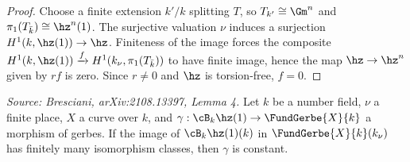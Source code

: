 \begin{proof}
  Choose a finite extension \(k'/k\) splitting \(T\), so \(T_{k'} \cong \Gm^n\) and
  \(\pi_1(T_{\bar{k}}) \cong \hz^n(1)\). The surjective valuation \(\nu\) induces a
  surjection \(H^1(k, \hz(1)) \to \hz\). Finiteness of the image forces the composite
  \(H^1(k, \hz(1)) \xrightarrow{f} H^1(k_\nu, \pi_1(T_{\bar{k}}))\) to have finite
  image, hence the map \(\hz \to \hz^n\) given by \(rf\) is zero. Since \(r \neq 0\)
  and \(\hz\) is torsion-free, \(f = 0\).
\end{proof}

\begin{lemma}[UniqueLoopCurve]
  \label{lem:unique-loop-curve}
  \textit{Source: Bresciani, arXiv:2108.13397, Lemma 4.}
  Let \(k\) be a number field, \(\nu\) a finite place, \(X\) a curve over \(k\), and
  \(\gamma : \cB_k \hz(1) \to \FundGerbe{X}{k}\) a morphism of gerbes. If the image
  of \(\cB_k \hz(1)(k)\) in \(\FundGerbe{X}{k}(k_\nu)\) has finitely many isomorphism
  classes, then \(\gamma\) is constant.
\end{lemma}

